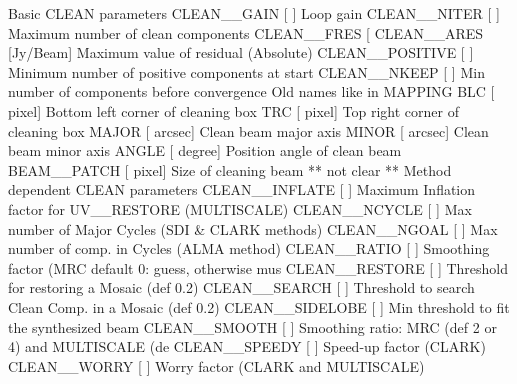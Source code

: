 Basic CLEAN parameters
CLEAN__GAIN       [       ] Loop gain
CLEAN__NITER      [       ] Maximum number of clean components
CLEAN__FRES       [      %
CLEAN__ARES       [Jy/Beam] Maximum value of residual (Absolute)
CLEAN__POSITIVE   [       ] Minimum number of positive components at start
CLEAN__NKEEP      [       ] Min number of components before convergence
Old names like in MAPPING
BLC              [  pixel] Bottom left corner of cleaning box
TRC              [  pixel] Top right corner of cleaning box
MAJOR            [ arcsec] Clean beam major axis
MINOR            [ arcsec] Clean beam minor axis
ANGLE            [ degree] Position angle of clean beam
BEAM__PATCH       [  pixel] Size of cleaning beam ** not clear **
Method dependent CLEAN parameters
CLEAN__INFLATE    [      ] Maximum Inflation factor for UV__RESTORE (MULTISCALE)
CLEAN__NCYCLE     [      ] Max number of Major Cycles (SDI & CLARK methods)
CLEAN__NGOAL      [      ] Max number of comp. in Cycles (ALMA method)
CLEAN__RATIO      [      ] Smoothing factor (MRC default 0: guess, otherwise mus
CLEAN__RESTORE    [      ] Threshold for restoring a Mosaic (def 0.2)
CLEAN__SEARCH     [      ] Threshold to search Clean Comp. in a Mosaic (def 0.2)
CLEAN__SIDELOBE   [      ] Min threshold to fit the synthesized beam
CLEAN__SMOOTH     [      ] Smoothing ratio: MRC (def 2 or 4)  and MULTISCALE (de
CLEAN__SPEEDY     [      ] Speed-up factor (CLARK)
CLEAN__WORRY      [      ] Worry factor (CLARK and MULTISCALE)

